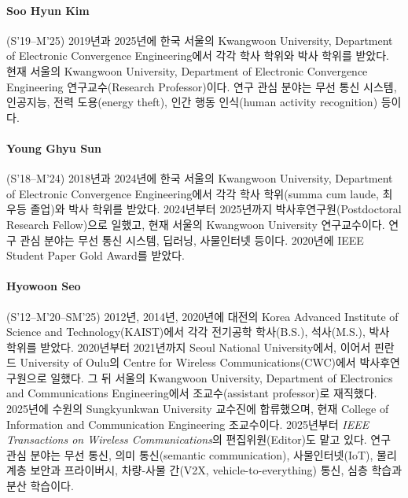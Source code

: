 \paragraph{Soo Hyun Kim} (S'19--M'25)
2019년과 2025년에 한국 서울의 Kwangwoon University, Department of Electronic Convergence Engineering에서 각각 학사 학위와 박사 학위를 받았다.
현재 서울의 Kwangwoon University, Department of Electronic Convergence Engineering 연구교수(Research Professor)이다.
연구 관심 분야는 무선 통신 시스템, 인공지능, 전력 도용(energy theft), 인간 행동 인식(human activity recognition) 등이다.

\paragraph{Young Ghyu Sun} (S'18--M'24)
2018년과 2024년에 한국 서울의 Kwangwoon University, Department of Electronic Convergence Engineering에서 각각 학사 학위(summa cum laude, 최우등 졸업)와 박사 학위를 받았다.
2024년부터 2025년까지 박사후연구원(Postdoctoral Research Fellow)으로 일했고, 현재 서울의 Kwangwoon University 연구교수이다.
연구 관심 분야는 무선 통신 시스템, 딥러닝, 사물인터넷 등이다.
2020년에 IEEE Student Paper Gold Award를 받았다.

\paragraph{Hyowoon Seo} (S'12--M'20--SM'25)
2012년, 2014년, 2020년에 대전의 Korea Advanced Institute of Science and Technology(KAIST)에서 각각 전기공학 학사(B.S.), 석사(M.S.), 박사 학위를 받았다.
2020년부터 2021년까지 Seoul National University에서, 이어서 핀란드 University of Oulu의 Centre for Wireless Communications(CWC)에서 박사후연구원으로 일했다.
그 뒤 서울의 Kwangwoon University, Department of Electronics and Communications Engineering에서 조교수(assistant professor)로 재직했다.
2025년에 수원의 Sungkyunkwan University 교수진에 합류했으며, 현재 College of Information and Communication Engineering 조교수이다.
2025년부터 \emph{IEEE Transactions on Wireless Communications}의 편집위원(Editor)도 맡고 있다.
연구 관심 분야는 무선 통신, 의미 통신(semantic communication), 사물인터넷(IoT), 물리 계층 보안과 프라이버시, 차량-사물 간(V2X, vehicle-to-everything) 통신, 심층 학습과 분산 학습이다.

